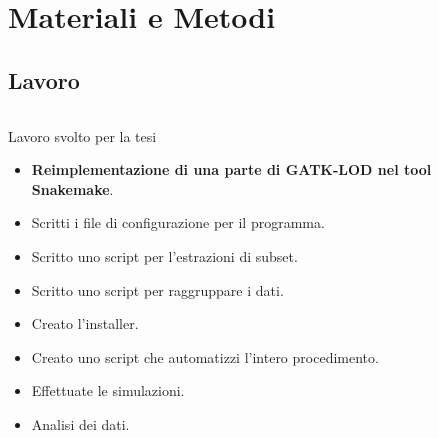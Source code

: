\documentclass{beamer}
\begin{document}
\section{Materiali e Metodi}

\subsection{Lavoro}
\begin{frame}
\begin{columns}
\begin{column}{0.8\linewidth}
\begin{block}{Lavoro svolto per la tesi}
\begin{itemize}
\item \textbf{Reimplementazione di una parte di GATK-LOD nel tool Snakemake}.
\item Scritti i file di configurazione per il programma.
\item Scritto uno script per l'estrazioni di subset.
\item Scritto uno script per raggruppare i dati.
\item Creato l'installer.
\item Creato uno script che automatizzi l'intero procedimento.
\item Effettuate le simulazioni.
\item Analisi dei dati.
\end{itemize}
\end{block}
\end{column}
\end{columns}
\end{frame}

\end{document}
